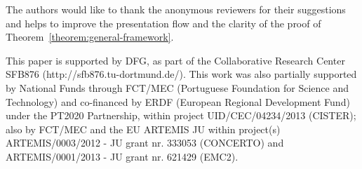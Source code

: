 \documentclass[conference]{IEEEtran}
\begin{document}
  The authors would like to thank the anonymous reviewers for their suggestions and helps to improve the presentation flow and the clarity of the proof of Theorem~\ref{theorem:general-framework}. 

This paper is supported by DFG, as part of the Collaborative Research Center SFB876 (http://sfb876.tu-dortmund.de/). This work was also partially supported by National Funds through FCT/MEC (Portuguese Foundation for Science and Technology) and co-financed by ERDF (European Regional Development Fund) under the PT2020 Partnership, within project UID/CEC/04234/2013 (CISTER); also by FCT/MEC and the EU ARTEMIS JU within project(s) ARTEMIS/0003/2012 - JU grant nr. 333053 (CONCERTO) and ARTEMIS/0001/2013 - JU grant nr. 621429 (EMC2).

{}

\end{document}
